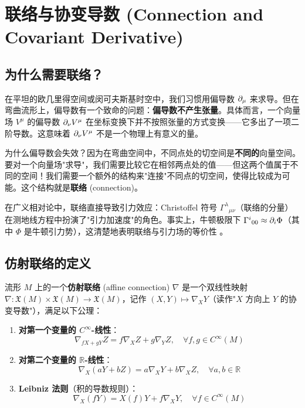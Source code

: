 \chapter{联络与协变导数 (Connection and Covariant Derivative)}
\label{chap:connection}

\section{为什么需要联络？}

\begin{note}[物理动机]
在平坦的欧几里得空间或闵可夫斯基时空中，我们习惯用偏导数 $\partial_\mu$ 来求导。但在弯曲流形上，偏导数有一个致命的问题：\textbf{偏导数不产生张量}。具体而言，一个向量场 $V^\mu$ 的偏导数 $\partial_\nu V^\mu$ 在坐标变换下并不按照张量的方式变换——它多出了一项二阶导数。这意味着 $\partial_\nu V^\mu$ 不是一个物理上有意义的量。

为什么偏导数会失效？因为在弯曲空间中，不同点处的切空间是\textbf{不同的}向量空间。要对一个向量场"求导"，我们需要比较它在相邻两点处的值——但这两个值属于不同的空间！我们需要一个额外的结构来"连接"不同点的切空间，使得比较成为可能。这个结构就是\textbf{联络} (connection)。

在广义相对论中，联络直接导致引力效应：Christoffel 符号 $\Gamma^\lambda{}_{\mu\nu}$（联络的分量）在测地线方程中扮演了"引力加速度"的角色。事实上，牛顿极限下 $\Gamma^i{}_{00} \approx \partial_i \Phi$（其中 $\Phi$ 是牛顿引力势），这清楚地表明联络与引力场的等价性 \cite{Carroll1997,ConnectionsDG2013}。
\end{note}

\section{仿射联络的定义}

\begin{definition}
流形 $M$ 上的一个\textbf{仿射联络} (affine connection) $\nabla$ 是一个双线性映射 $\nabla: \mathfrak{X}(M) \times \mathfrak{X}(M) \to \mathfrak{X}(M)$，记作 $(X, Y) \mapsto \nabla_X Y$（读作"$X$ 方向上 $Y$ 的协变导数"），满足以下公理：

\begin{enumerate}
    \item \textbf{对第一个变量的 $C^\infty$-线性}：
    \begin{equation}
        \nabla_{fX + gY} Z = f \nabla_X Z + g \nabla_Y Z, \quad \forall f,g \in C^\infty(M)
    \end{equation}
    \item \textbf{对第二个变量的 $\mathbb{R}$-线性}：
    \begin{equation}
        \nabla_X (aY + bZ) = a \nabla_X Y + b \nabla_X Z, \quad \forall a,b \in \mathbb{R}
    \end{equation}
    \item \textbf{Leibniz 法则}（积的导数规则）：
    \begin{equation}
        \nabla_X (f Y) = X(f) Y + f \nabla_X Y, \quad \forall f \in C^\infty(M)
    \end{equation}
\end{enumerate}
\end{definition}

